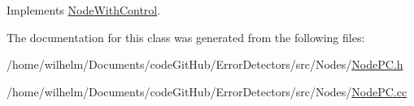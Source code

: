 Implements \hyperlink{class_node_with_control_a84df0beabbaed80e7da017d592480515}{Node\+With\+Control}.



The documentation for this class was generated from the following files\+:\begin{DoxyCompactItemize}
\item 
/home/wilhelm/\+Documents/code\+Git\+Hub/\+Error\+Detectors/src/\+Nodes/\hyperlink{_node_p_c_8h}{Node\+P\+C.\+h}\item 
/home/wilhelm/\+Documents/code\+Git\+Hub/\+Error\+Detectors/src/\+Nodes/\hyperlink{_node_p_c_8cc}{Node\+P\+C.\+cc}\end{DoxyCompactItemize}

